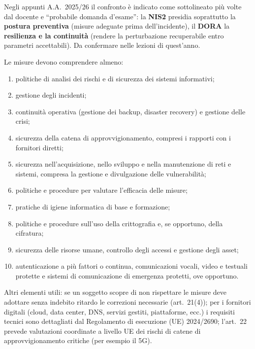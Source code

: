 \begin{nota}
Negli appunti A.A.~2025/26 il confronto è indicato come sottolineato più volte dal docente e
``probabile domanda d'esame'': la \textbf{NIS2} presidia soprattutto la \textbf{postura preventiva}
(misure adeguate prima dell'incidente), il \textbf{DORA} la \textbf{resilienza e la continuità}
(rendere la perturbazione recuperabile entro parametri accettabili). Da confermare nelle lezioni di
quest'anno.
\end{nota}

\begin{integrazione}
Le misure devono comprendere almeno:
\begin{enumerate}[label=(\alph*)]
  \item politiche di analisi dei rischi e di sicurezza dei sistemi informativi;
  \item gestione degli incidenti;
  \item continuità operativa (gestione dei backup, disaster recovery) e gestione delle crisi;
  \item sicurezza della catena di approvvigionamento, compresi i rapporti con i fornitori diretti;
  \item sicurezza nell'acquisizione, nello sviluppo e nella manutenzione di reti e sistemi, compresa
    la gestione e divulgazione delle vulnerabilità;
  \item politiche e procedure per valutare l'efficacia delle misure;
  \item pratiche di igiene informatica di base e formazione;
  \item politiche e procedure sull'uso della crittografia e, se opportuno, della cifratura;
  \item sicurezza delle risorse umane, controllo degli accessi e gestione degli asset;
  \item autenticazione a più fattori o continua, comunicazioni vocali, video e testuali protette e
    sistemi di comunicazione di emergenza protetti, ove opportuno.
\end{enumerate}
Altri elementi utili: se un soggetto scopre di non rispettare le misure deve adottare senza indebito
ritardo le correzioni necessarie (art.~21(4)); per i fornitori digitali (cloud, data center, DNS,
servizi gestiti, piattaforme, ecc.) i requisiti tecnici sono dettagliati dal Regolamento di esecuzione
(UE) 2024/2690; l'art.~22 prevede valutazioni coordinate a livello UE dei rischi di catene di
approvvigionamento critiche (per esempio il 5G).
\end{integrazione}

